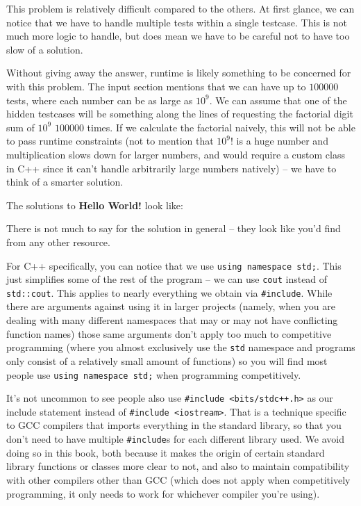 \hrulefill

This problem is relatively difficult compared to the others. At first glance, we can notice that we have to handle multiple tests within a single testcase. This is not much more logic to handle, but does mean we have to be careful not to have too slow of a solution.

Without giving away the answer, runtime is likely something to be concerned for with this problem. The input section mentions that we can have up to $100000$ tests, where each number can be as large as $10^9$. We can assume that one of the hidden testcases will be something along the lines of requesting the factorial digit sum of $10^9$ $100000$ times. If we calculate the factorial naively, this will not be able to pass runtime constraints (not to mention that $10^9!$ is a huge number and multiplication slows down for larger numbers, and would require a custom class in C++ since it can't handle arbitrarily large numbers natively) -- we have to think of a smarter solution.

\hrulefill

The solutions to \textbf{Hello World!} look like:


There is not much to say for the solution in general -- they look like you'd find from any other resource.

For C++ specifically, you can notice that we use \texttt{using namespace std;}. This just simplifies some of the rest of the program -- we can use \texttt{cout} instead of \texttt{std::cout}. This applies to nearly everything we obtain via \texttt{#include}. While there are arguments against using it in larger projects (namely, when you are dealing with many different namespaces that may or may not have conflicting function names) those same arguments don't apply too much to competitive programming (where you almost exclusively use the \texttt{std} namespace and programs only consist of a relatively small amount of functions) so you will find most people use \texttt{using namespace std;} when programming competitively.

It's not uncommon to see people also use \texttt{#include <bits/stdc++.h>} as our include statement instead of \texttt{#include <iostream>}. That is a technique specific to GCC compilers that imports everything in the standard library, so that you don't need to have multiple \texttt{#include}s for each different library used. We avoid doing so in this book, both because it makes the origin of certain standard library functions or classes more clear to not, and also to maintain compatibility with other compilers other than GCC (which does not apply when competitively programming, it only needs to work for whichever compiler you're using).

